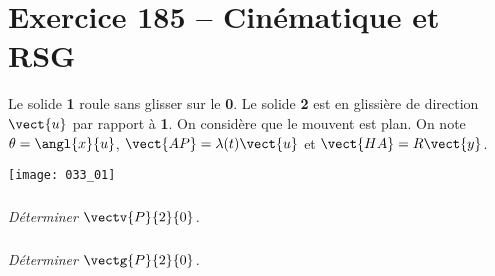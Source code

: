 \section*{Exercice 185 -- Cinématique et RSG}
\setcounter{exo}{0}

Le solide \textbf{1} roule sans glisser sur le \textbf{0}. Le solide \textbf{2} est en glissière de direction $\vect{u}$ par rapport à \textbf{1}. On considère que le mouvent est plan. 
On note $\theta=\angl{x}{u}$, $\vect{AP}=\lambda(t)\vect{u}$ et $\vect{HA}=R\vect{y}$.

\begin{center}
\texttt{[image: 033\_01]}
\end{center}

\subparagraph{}
\textit{Déterminer $\vectv{P}{2}{0}$.}
\ifprof
\begin{corrige}

\end{corrige}
\else
\fi

\subparagraph{}
\textit{Déterminer $\vectg{P}{2}{0}$.}
\ifprof
\begin{corrige}

\end{corrige}
\else
\fi
